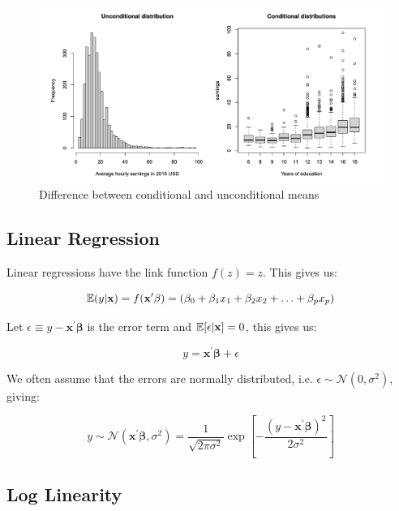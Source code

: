 \documentclass[11pt]{article}
\begin{document}
\begin{figure}[h]
    \centering
    \includegraphics[width=\textwidth]{pic/conditional mean.png}
    \caption{Difference between conditional and unconditional means}
    \label{fig:conditional means}
\end{figure}

\subsection{Linear Regression}

Linear regressions have the link function $f(z) = z$. This gives us:

\begin{equation*}
    \mathbb{E}(y|\mathbf{x}) = f(\mathbf{x^\prime\beta}) = (\beta_0 + \beta_1 x_1 + \beta_2 x_2 +\ldots + \beta_p x_p)
\end{equation*}

Let $\epsilon \equiv y - \mathbf{x^\prime\beta}$ is the error term and $\mathbb{E}[\epsilon|\mathbf{x}] = 0$, this gives us:

\begin{equation}
    \label{eq:lin reg}
    y = \mathbf{x^\prime\beta} + \epsilon   
\end{equation}

We often assume that the errors are normally distributed, i.e. $\epsilon \sim \mathcal{N}(0,\sigma^2)$, giving:

\begin{equation}
\label{gaussian linear reg}
    y \sim \mathcal{N}(\mathbf{x^\prime\beta}, \sigma^2) = \dfrac{1}{\sqrt{2\pi\sigma^2}}\exp\left[-\dfrac{(y - \mathbf{x^\prime\beta})^2}{2\sigma^2}\right]
\end{equation}

\subsection{Log Linearity}
\end{document}
